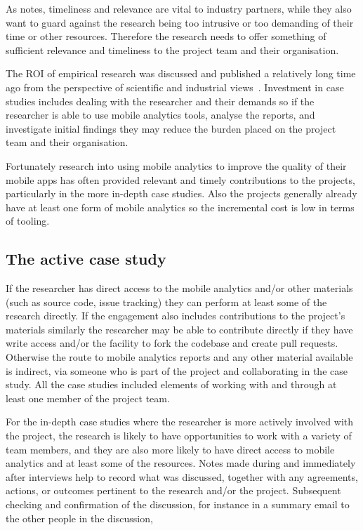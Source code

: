 As \citet[p.324]{barroca_2018_bridging_the_gap} notes, timeliness and relevance are vital to industry partners, while they also want to guard against the research being too intrusive or too demanding of their time or other resources. Therefore the research needs to offer something of sufficient relevance and timeliness to the project team and their organisation. 

The ROI of empirical research was discussed and published a relatively long time ago from the perspective of scientific and industrial views~\citet[pp54-57]{prechelt_2007_optimizing_ROI_for_empirical_SE_studies}. Investment in case studies includes dealing with the researcher and their demands so if the researcher is able to use mobile analytics tools, analyse the reports, and investigate initial findings they may reduce the burden placed on the project team and their organisation.

Fortunately research into using mobile analytics to improve the quality of their mobile apps has often provided relevant and timely contributions to the projects, particularly in the more in-depth case studies. Also the projects generally already have at least one form of mobile analytics so the incremental cost is low in terms of tooling.
 
\subsection{The active case study}
If the researcher has direct access to the mobile analytics and/or other materials (such as source code, issue tracking) they can perform at least some of the research directly. If the engagement also includes contributions to the project's materials similarly the researcher may be able to contribute directly if they have write access and/or the facility to fork the codebase and create pull requests. Otherwise the route to mobile analytics reports and any other material available is indirect, via someone who is part of the project and collaborating in the case study. All the case studies included elements of working with and through at least one member of the project team.

For the in-depth case studies where the researcher is more actively involved with the project, the research is likely to have opportunities to work with a variety of team members, and they are also more likely to have direct access to mobile analytics and at least some of the resources. Notes made during and immediately after interviews help to record what was discussed, together with any agreements, actions, or outcomes pertinent to the research and/or the project. Subsequent checking and confirmation of the discussion, for instance in a summary email to the other people in the discussion, 

